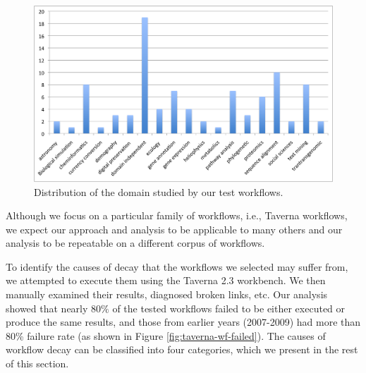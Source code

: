  \begin{figure}[h]
  \begin{center}
    \includegraphics[width=13cm]{./Figures/domain-features.png}
        \caption{Distribution of the domain studied by our test workflows.}
        \label{fig:domain_distribution}
  \end{center}
\end{figure}


Although we focus on a particular family of workflows, i.e., Taverna workflows, we expect our approach and analysis to be applicable to many others and our analysis to be repeatable on a different corpus of workflows. 

To identify the causes of decay that the workflows we selected may suffer from, we attempted to execute them using the Taverna 2.3 workbench. We then manually examined their results, diagnosed broken links, etc. Our analysis showed that nearly $80\%$ of the tested workflows failed to be either executed or produce the same results, and those from earlier years (2007-2009) had more than 80\% failure rate (as shown in Figure \ref{fig:taverna-wf-failed}). The causes of workflow decay can be classified into four categories, which we present in the rest of this section. 


